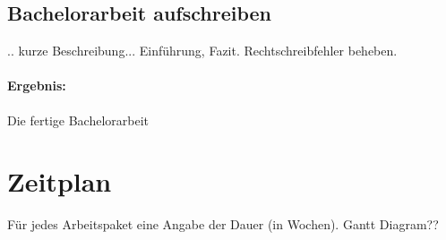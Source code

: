 \documentclass[a4paper]{article}
\begin{document}
\subsection{Bachelorarbeit aufschreiben}

.. kurze Beschreibung...
Einführung, Fazit. Rechtschreibfehler beheben.

\paragraph{Ergebnis:}
Die fertige Bachelorarbeit


\section{Zeitplan}

Für jedes Arbeitspaket eine Angabe der Dauer (in Wochen).
Gantt Diagram??




\end{document}
